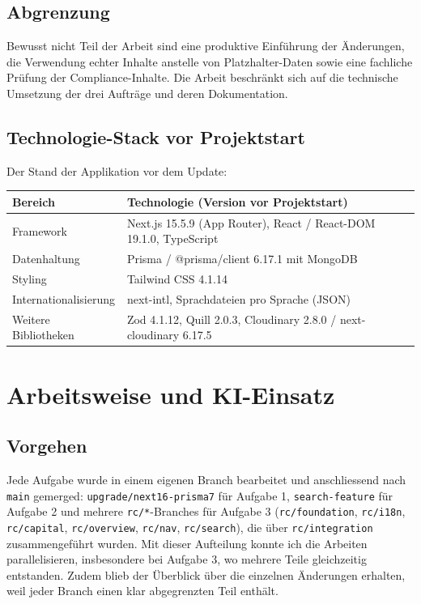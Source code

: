 \documentclass[11pt,a4paper]{article}
\let\oldsubsection\subsection
\renewcommand{\subsection}{\needspace{6\baselineskip}\oldsubsection}
\begin{document}
\subsection{Abgrenzung}
Bewusst nicht Teil der Arbeit sind eine produktive Einführung der Änderungen, die Verwendung echter Inhalte anstelle von Platzhalter-Daten sowie eine fachliche Prüfung der Compliance-Inhalte. Die Arbeit beschränkt sich auf die technische Umsetzung der drei Aufträge und deren Dokumentation.

\subsection{Technologie-Stack vor Projektstart}
Der Stand der Applikation vor dem Update:
\begin{center}
\begin{tabularx}{\textwidth}{l X}
\toprule
\textbf{Bereich} & \textbf{Technologie (Version vor Projektstart)} \\
\midrule
Framework & Next.js 15.5.9 (App Router), React / React-DOM 19.1.0, TypeScript \\
Datenhaltung & Prisma / @prisma/client 6.17.1 mit MongoDB \\
Styling & Tailwind CSS 4.1.14 \\
Internationalisierung & next-intl, Sprachdateien pro Sprache (JSON) \\
Weitere Bibliotheken & Zod 4.1.12, Quill 2.0.3, Cloudinary 2.8.0 / next-cloudinary 6.17.5 \\
\bottomrule
\end{tabularx}
\end{center}

\section{Arbeitsweise und KI-Einsatz}

\subsection{Vorgehen}
Jede Aufgabe wurde in einem eigenen Branch bearbeitet und anschliessend nach \texttt{main} gemerged: \texttt{upgrade/next16-prisma7} für Aufgabe 1, \texttt{search-feature} für Aufgabe 2 und mehrere \texttt{rc/*}-Branches für Aufgabe 3 (\texttt{rc/foundation}, \texttt{rc/i18n}, \texttt{rc/capital}, \texttt{rc/overview}, \texttt{rc/nav}, \texttt{rc/search}), die über \texttt{rc/integration} zusammengeführt wurden. Mit dieser Aufteilung konnte ich die Arbeiten parallelisieren, insbesondere bei Aufgabe 3, wo mehrere Teile gleichzeitig entstanden. Zudem blieb der Überblick über die einzelnen Änderungen erhalten, weil jeder Branch einen klar abgegrenzten Teil enthält.
\end{document}
